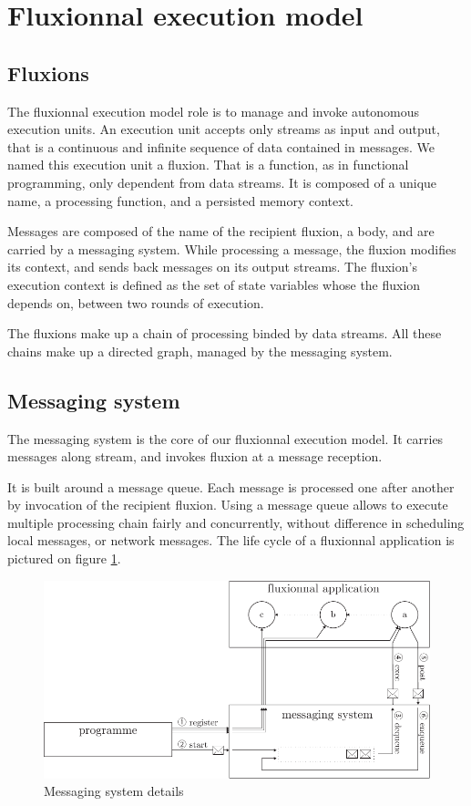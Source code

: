 \section{Fluxionnal execution model} \label{section:model}

\subsection{Fluxions}

The fluxionnal execution model role is to manage and invoke autonomous execution units.
An execution unit accepts only streams as input and output, that is a continuous and infinite sequence of data contained in messages.
We named this execution unit a fluxion.
That is a function, as in functional programming, only dependent from data streams.
It is composed of a unique name, a processing function, and a persisted memory context.

Messages are composed of the name of the recipient fluxion, a body, and are carried by a messaging system.
While processing a message, the fluxion modifies its context, and sends back messages on its output streams.
The fluxion's execution context is defined as the set of state variables whose the fluxion depends on, between two rounds of execution.

The fluxions make up a chain of processing binded by data streams.
All these chains make up a directed graph, managed by the messaging system.

\subsection{Messaging system}

The messaging system is the core of our fluxionnal execution model.
It carries messages along stream, and invokes fluxion at a message reception.

It is built around a message queue.
Each message is processed one after another by invocation of the recipient fluxion.
Using a message queue allows to execute multiple processing chain fairly and concurrently, without difference in scheduling local messages, or network messages.
The life cycle of a fluxionnal application is pictured on figure \ref{fig:MesSys}.

\begin{figure}[h!]
  \includegraphics[width=\linewidth]{schema-message.pdf}
  \caption{Messaging system details}
  \label{fig:MesSys}
\end{figure}

